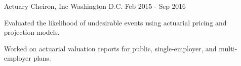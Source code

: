 \begin{cventries}
  \cventry
    {Actuary} %
    {Cheiron, Inc} %
    {Washington D.C.} %
    {Feb 2015 - Sep 2016} %
    {
      \begin{cvitems} %
        \item Evaluated the likelihood of undesirable events using actuarial pricing and projection models.
        \item Worked on actuarial valuation reports for public, single-employer, and multi-employer plans.
      \end{cvitems}
    }


\end{cventries}
